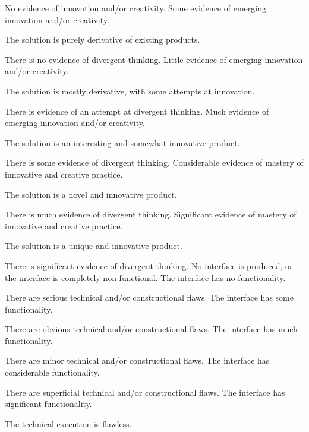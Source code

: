 \documentclass{../../fal_assignment}
\begin{document}
\begin{markingrubric}
        \grade\fail No evidence of innovation and/or creativity.
        \grade Some evidence of emerging innovation and/or creativity.
            \par The solution is purely derivative of existing products.
            \par There is no evidence of divergent thinking.
        \grade Little evidence of emerging innovation and/or creativity.
            \par The solution is mostly derivative, with some attempts at innovation.
            \par There is evidence of an attempt at divergent thinking.
        \grade Much evidence of emerging innovation and/or creativity.
            \par The solution is an interesting and somewhat innovative product.
            \par There is some evidence of divergent thinking.
        \grade Considerable evidence of mastery of innovative and creative practice.
            \par The solution is a novel and innovative product.
            \par There is much evidence of divergent thinking.
        \grade Significant evidence of mastery of innovative and creative practice.
            \par The solution is a unique and innovative product.
            \par There is significant evidence of divergent thinking.
%            
        \grade\fail No interface is produced, or the interface is completely non-functional.
        \grade The interface has no functionality.
            \par There are serious technical and/or constructional flaws.
        \grade The interface has some functionality.
            \par There are obvious technical and/or constructional flaws.
        \grade The interface has much functionality.
            \par There are minor technical and/or constructional flaws.
        \grade The interface has considerable functionality.
            \par There are superficial technical and/or constructional flaws.
        \grade The interface has significant functionality.
            \par The technical execution is flawless.


\end{markingrubric}
\end{document}
